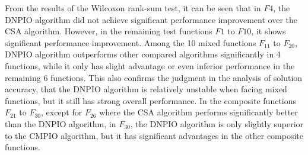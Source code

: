 \documentclass[preprint,review,compress,12pt]{elsarticle}
\begin{document}
From the results of the Wilcoxon rank-sum test, it can be seen that in $F4$, the DNPIO algorithm did not achieve significant performance improvement over the CSA algorithm. However, in the remaining test functions $F1$ to $F10$, it shows significant performance improvement. Among the 10 mixed functions $F_{11}$ to $F_{20}$, DNPIO algorithm outperforms other compared algorithms significantly in 4 functions, while it only has slight advantage or even inferior performance in the remaining 6 functions. This also confirms the judgment in the analysis of solution accuracy, that the DNPIO algorithm is relatively unstable when facing mixed functions, but it still has strong overall performance. In the composite functions $F_{21}$ to $F_{30}$, except for $F_{26}$ where the CSA algorithm performs significantly better than the DNPIO algorithm, in $F_{30}$, the DNPIO algorithm is only slightly superior to the CMPIO algorithm, but it has significant advantages in the other composite functions.
\end{document}
